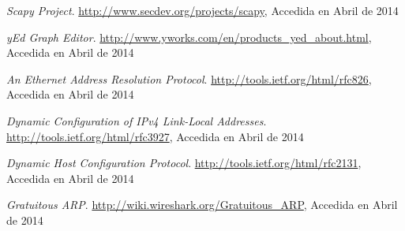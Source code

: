 \documentclass[a4paper, 10pt, twoside]{article}
\begin{document}
\begin{thebibliography}{9}

	\emph{Scapy Project}.
	\url{http://www.secdev.org/projects/scapy}, 
	Accedida en Abril de 2014

	\emph{yEd Graph Editor}.
	\url{http://www.yworks.com/en/products_yed_about.html}, 
	Accedida en Abril de 2014

	\emph{An Ethernet Address Resolution Protocol}.
	\url{http://tools.ietf.org/html/rfc826}, 
	Accedida en Abril de 2014
	
	\emph{Dynamic Configuration of IPv4 Link-Local Addresses}.
	\url{http://tools.ietf.org/html/rfc3927}, 
	Accedida en Abril de 2014
	
	\emph{Dynamic Host Configuration Protocol}.
	\url{http://tools.ietf.org/html/rfc2131}, 
	Accedida en Abril de 2014

	\emph{Gratuitous ARP}.
	\url{http://wiki.wireshark.org/Gratuitous_ARP}, 
	Accedida en Abril de 2014

\end{thebibliography}
\end{document}

